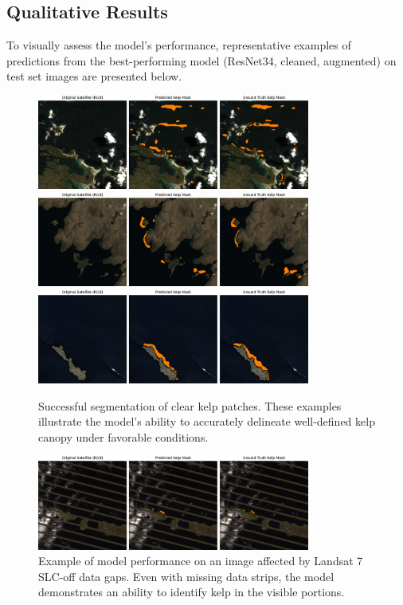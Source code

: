 \documentclass{article}
\begin{document}
\newpage

\subsection{Qualitative Results} %

To visually assess the model's performance, representative examples of predictions from the best-performing model (ResNet34, cleaned, augmented) on test set images are presented below.

\begin{figure}[htbp]
    \centering
    \includegraphics[width=0.8\textwidth]{good2.png} %
    \includegraphics[width=0.8\textwidth]{good3.png}
    \includegraphics[width=0.8\textwidth]{good1.png}
    \caption{Successful segmentation of clear kelp patches. These examples illustrate the model's ability to accurately delineate well-defined kelp canopy under favorable conditions.}
    \label{fig:good_segmentation}
\end{figure}

\begin{figure}[htbp]
    \centering
    \includegraphics[width=0.8\textwidth]{goodslc.png} %
    \caption{Example of model performance on an image affected by Landsat 7 SLC-off data gaps. Even with missing data strips, the model demonstrates an ability to identify kelp in the visible portions.}
    \label{fig:slc_performance}
\end{figure}
\end{document}
